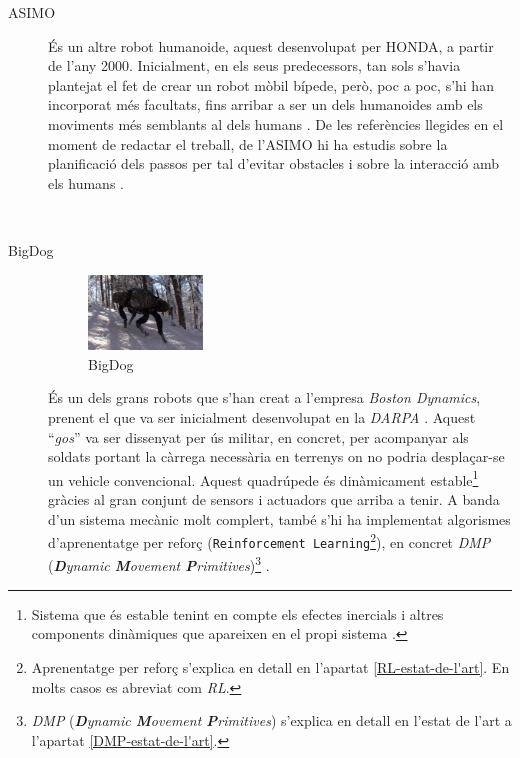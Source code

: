 \documentclass[12pt,a4paper,final,twoside]{article}
\begin{document}
\begin{description}
\item[ASIMO]
\begin{minipage}[t]{0.94\linewidth}

És un altre robot humanoide, aquest desenvolupat per HONDA, a partir de l'any 2000. Inicialment, en els seus predecessors, tan sols s'havia plantejat el fet de crear un robot mòbil bípede, però, poc a poc, s'hi han incorporat més facultats, fins arribar a ser un dels humanoides amb els moviments més semblants al dels humans \cite{ASIMO_History}. De les referències llegides en el moment de redactar el treball, de l'ASIMO hi ha estudis sobre la planificació dels passos per tal d'evitar obstacles \cite{Chestnutt2005} i sobre la interacció amb els humans \cite{Mutlu2006}.
\end{minipage}\\


\item[BigDog]
\begin{minipage}[t]{0.94\linewidth}
	\begin{figure}
	    \centering
		\includegraphics[width=0.30\textwidth]{Imatges/BigDog}
                \caption{BigDog \cite{Raibert2008}}
	\end{figure}
És un dels grans robots que s'han creat a l'empresa \textit{Boston Dynamics}, prenent el que va ser inicialment desenvolupat en la \textit{DARPA} \cite{Raibert2008}. Aquest ``\textit{gos}'' va ser dissenyat per ús militar, en concret, per acompanyar als soldats portant la càrrega necessària en terrenys on no podria desplaçar-se un vehicle convencional. Aquest quadrúpede és dinàmicament estable\footnote{Sistema que és estable tenint en compte els efectes inercials i altres components dinàmiques que apareixen en el propi sistema \cite{Purushotham2009}.} gràcies al gran conjunt de sensors i actuadors que arriba a tenir. A banda d'un sistema mecànic molt complert, també s'hi ha implementat algorismes d'aprenentatge per reforç (\texttt{Reinforcement Learning}\footnote{Aprenentatge per reforç s'explica en detall en l'apartat \ref{RL-estat-de-l'art}. En molts casos es abreviat com \textit{RL}.}), en concret \textit{DMP} (\textit{\textbf{D}ynamic \textbf{M}ovement \textbf{P}rimitives})\footnote{\textit{DMP} (\textit{\textbf{D}ynamic \textbf{M}ovement \textbf{P}rimitives}) s'explica en detall en l'estat de l'art a l'apartat \ref{DMP-estat-de-l'art}. } \cite{Raibert2008}.
\end{minipage}


\end{description}
\end{document}
